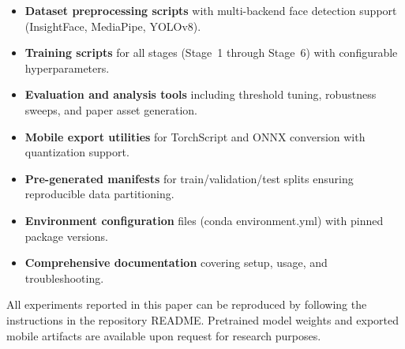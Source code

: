 \begin{itemize}[leftmargin=*,itemsep=2pt,parsep=0pt]
  \item \textbf{Dataset preprocessing scripts} with multi-backend face detection support (InsightFace, MediaPipe, YOLOv8).
  \item \textbf{Training scripts} for all stages (Stage~1 through Stage~6) with configurable hyperparameters.
  \item \textbf{Evaluation and analysis tools} including threshold tuning, robustness sweeps, and paper asset generation.
  \item \textbf{Mobile export utilities} for TorchScript and ONNX conversion with quantization support.
  \item \textbf{Pre-generated manifests} for train/validation/test splits ensuring reproducible data partitioning.
  \item \textbf{Environment configuration} files (conda environment.yml) with pinned package versions.
  \item \textbf{Comprehensive documentation} covering setup, usage, and troubleshooting.
\end{itemize}

All experiments reported in this paper can be reproduced by following the instructions in the repository README. Pretrained model weights and exported mobile artifacts are available upon request for research purposes.
